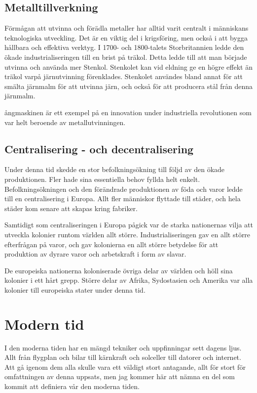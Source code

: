 \documentclass[a4paper,12pt,fleqn]{article}
\begin{document}
\subsection{Metalltillverkning}

Förmågan att utvinna och förädla metaller har alltid varit centralt i människans teknologiska utveckling. Det är en viktig del i krigsföring, men också i att bygga hållbara och effektiva verktyg. I 1700- och 1800-talets Storbritannien ledde den ökade industrialiseringen till en brist på träkol. Detta ledde till att man började utvinna och använda mer Stenkol. Stenkolet kan vid eldning ge en högre effekt än träkol varpå järnutvinning förenklades. Stenkolet användes bland annat för att smälta järnmalm för att utvinna järn, och också för att producera stål från denna järnmalm. 

ångmaskinen är ett exempel på en innovation under industriella revolutionen som var helt beroende av metallutvinningen. 

\subsection{Centralisering - och decentralisering}

Under denna tid skedde en stor befolkningsökning till följd av den ökade produktionen. Fler hade sina essentiella behov fyllda helt enkelt. Befolkningsökningen och den förändrade produktionen av föda och varor ledde till en centralisering i Europa. Allt fler människor flyttade till städer, och hela städer kom senare att skapas kring fabriker. 

Samtidigt som centraliseringen i Europa pågick var de starka nationernas vilja att utveckla kolonier runtom världen allt större. Industrialiseringen gav en allt större efterfrågan på varor, och gav kolonierna en allt större betydelse för att produktion av dyrare varor och arbetskraft i form av slavar. 

De europeiska nationerna koloniserade övriga delar av världen och höll sina kolonier i ett hårt grepp. Större delar av Afrika, Sydostasien och Amerika var alla kolonier till europeiska stater under denna tid. 


\newpage
\section{Modern tid}

I den moderna tiden har en mängd tekniker och uppfinningar sett dagens ljus. Allt från flygplan och bilar till kärnkraft och solceller till datorer och internet. Att gå igenom dem alla skulle vara ett väldigt stort antagande, allt för stort för omfattningen av denna uppsats, men jag kommer här att nämna en del som kommit att definiera vår den moderna tiden.  
\end{document}
